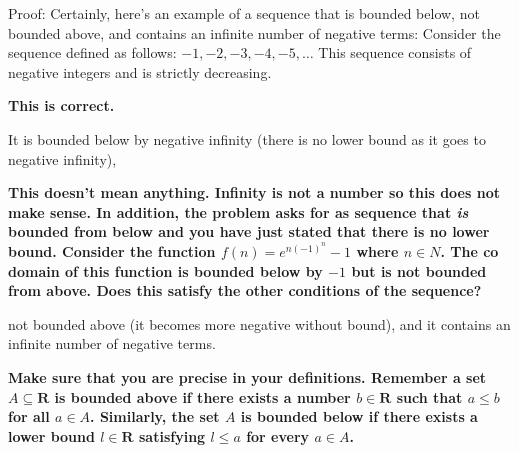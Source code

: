 \documentclass{report}
\begin{document}
Proof: Certainly, here's an example of a sequence that is bounded below, not bounded above, and contains an infinite number of negative terms:
Consider the sequence defined as follows: $-1,-2,-3,-4,-5, \ldots$
This sequence consists of negative integers and is strictly decreasing.

\par
\textbf{This is correct.}

It is bounded below by negative infinity (there is no lower bound as it goes to negative infinity), 
\par
\textbf{
  This doesn't mean anything. Infinity is not a number so this does not make sense. In addition, the problem asks for as sequence that \textit{is} bounded from below and you have just stated that there is no lower bound. Consider the function $f(n) =e^{n(-1)^n} -1$ where $n \in N$. The co domain of this function is bounded below by $-1$ but is not bounded from above. Does this satisfy the other conditions of the sequence?
}

not bounded above (it becomes more negative without bound), and it contains an infinite number of negative terms.

\textbf{Make sure that you are precise in your definitions.
Remember a set $A \subseteq \mathbf{R}$ is bounded above if there exists a number $b \in \mathbf{R}$ such that $a \leqslant b$ for all $a \in A$.  Similarly, the set $A$ is bounded below if there exists a lower bound $l \in \mathbf{R}$ satisfying $l \leqslant a$ for every $a \in A$.}
\end{document}
